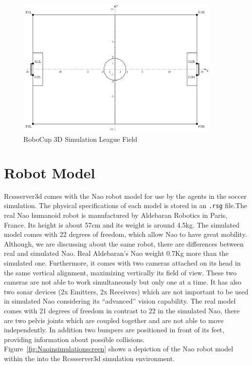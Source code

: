 \begin{figure}[t!]
\centering
  \includegraphics[width=0.9\textwidth]{Chapter2/figures/SoccerSimulation_FieldPlan.png}
  \caption{RoboCup 3D Simulation League Field} 
  \label{fig:SimulationSoccerField}
\end{figure}


\section{Robot Model}
Rcssserver3d comes with the Nao robot model for use by the agents in the soccer simulation. The physical specifications of each model is stored in an \texttt{.rsg} file.The real Nao humanoid robot is manufactured by Aldebaran Robotics in Paris, France. Its height is about 57cm and its weight is around 4.5kg. The simulated model comes with 22 degrees of freedom, which allow Nao to have great mobility. Although, we are discussing about the same robot, there are differences between real and simulated Nao. Real Aldebaran's Nao weight 0.7Kg more than the simulated one. Furthermore, it comes with two cameras attached on its head in the same vertical alignment, maximizing vertically its field of view. These two cameras are not able to work simultaneously but only one at a time. It has also two sonar devices (2x Emitters, 2x Receivers) which are not important to be used in simulated Nao considering its ``advanced'' vision capability. The real model comes with 21 degrees of freedom in contrast to 22 in the simulated Nao, there are two pelvis joints which are coupled together and are not able to move independently. In addition two bumpers are positioned in front of its feet, providing information about possible collisions. Figure~\ref{fig:Naoinsimulationscreen} shows a depiction of the Nao robot model within the into the Rcssserver3d simulation environment.

